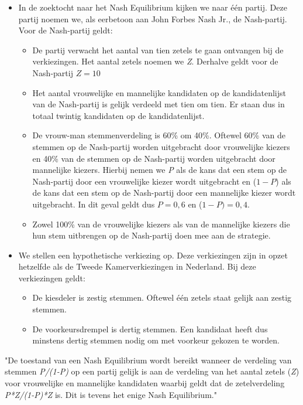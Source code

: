 \begin{itemize}
	\item
In de zoektocht naar het Nash Equilibrium kijken we naar één partij. Deze partij noemen we, als eerbetoon aan John Forbes Nash Jr., de Nash-partij. Voor de Nash-partij geldt:
		\begin{itemize}
			\item
			De partij verwacht het aantal van tien zetels te gaan ontvangen bij de verkiezingen. Het aantal zetels noemen we \textit{Z}. Derhalve geldt voor de Nash-partij $Z=10$
			\item
			Het aantal vrouwelijke en mannelijke kandidaten op de kandidatenlijst van de Nash-partij is gelijk verdeeld met tien om tien. Er staan dus in totaal twintig kandidaten op de kandidatenlijst. 
			\item
			De vrouw-man stemmenverdeling is 60\% om 40\%. Oftewel 60\% van de stemmen op de Nash-partij worden uitgebracht door vrouwelijke kiezers en 40\% van de stemmen op de Nash-partij worden uitgebracht door mannelijke kiezers. Hierbij nemen we \textit{P} als de kans dat een stem op de Nash-partij door een vrouwelijke kiezer wordt uitgebracht en ($1-P$) als de kans dat een stem op de Nash-partij door een mannelijke kiezer wordt uitgebracht. In dit geval geldt dus $P=0,6$ en ($1-P)=0,4$.
			\item
			Zowel 100\% van de vrouwelijke kiezers als van de mannelijke kiezers die hun stem uitbrengen op de Nash-partij doen mee aan de strategie.
		\end{itemize}
	\item
We stellen een hypothetische verkiezing op. Deze verkiezingen zijn in opzet hetzelfde als de Tweede Kamerverkiezingen in Nederland. Bij deze verkiezingen geldt:
		\begin{itemize}
			\item 
		De kiesdeler is zestig stemmen. Oftewel één zetels staat gelijk aan zestig stemmen.
		\item
		De voorkeursdrempel is dertig stemmen. Een kandidaat heeft dus minstens dertig stemmen nodig om met voorkeur gekozen te worden.
		\end{itemize}
\end{itemize}

\begin{theorem} "De toestand van een Nash Equilibrium wordt bereikt wanneer de verdeling van stemmen \textit{P/(1-P)} op een partij gelijk is aan de verdeling van het aantal zetels (\textit{Z}) voor vrouwelijke en mannelijke kandidaten waarbij geldt dat de zetelverdeling \textit{P*Z/(1-P)*Z} is. Dit is tevens het enige Nash Equilibrium." \\
\end{theorem}

